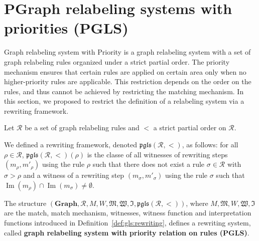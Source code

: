  \section{PGraph relabeling systems with priorities (PGLS)}
    Graph relabeling system with Priority is a graph relabeling system with a set of graph relabeling rules organized under a strict partial order. The priority mechanism ensures that certain rules are applied on certain area only when no higher-priority rules are applicable. This restriction depends on the order on the rules, and thus cannot be achieved by restricting the matching mechanism. In this section, we proposed to restrict the definition of a relabeling system via a rewriting framework.

 

    \begin{definition}
    \end{definition}
    
    \begin{definition}
      \label{def:pgls_framework}
    
      Let $\mathcal{R}$ be a set of graph relabeling rules and $<$ a strict partial order on $\mathcal{R}$.
    
      We defined a rewriting framework, denoted $\mathfrak{pgls}(\mathcal{R},<)$, as follows: for all $\rho \mathop{\in} \mathcal{R}$,
      $\mathfrak{pgls}(\mathcal{R},<)(\rho)$ is the classe of all witnesses of rewriting steps
      $\left(  m_\rho, m'_\rho \right)$ using the rule $\rho$
      such that there does not exist 
      a rule $\sigma \mathop{\in} \mathcal{R}$ with $\sigma \mathop{>} \rho$ and a witness of a rewriting step
      $\left(  m_\sigma, m'_\sigma \right)$ using the rule $\sigma$ such that 
      $\operatorname{Im}(m_\rho) \mathop{\cap} \operatorname{Im}(m_\sigma) \mathop{\neq} \emptyset$.
 
      The structure $(\mathbf{Graph},\mathcal{R},M,W,\mathfrak{M},\mathfrak{W},\mathfrak{I}, \mathfrak{pgls}(\mathcal{R},<))$, where $M, \mathfrak{M}, W , \mathfrak{W}, \mathfrak{I}$ are the match, match mechanism, witnesses, witness function and interpretation functions introduced in Definition~\ref{def:gls:rewriting}, defines a rewriting system, called \textbf{graph relabeling system with priority relation on rules (PGLS)}. 

    \end{definition}
     
